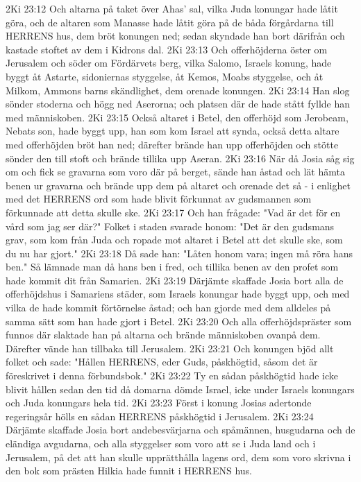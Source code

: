 2Ki 23:12  Och altarna på taket över Ahas' sal, vilka Juda konungar hade låtit göra, och de altaren som Manasse hade låtit göra på de båda förgårdarna till HERRENS hus, dem bröt konungen ned; sedan skyndade han bort därifrån och kastade stoftet av dem i Kidrons dal.
2Ki 23:13  Och offerhöjderna öster om Jerusalem och söder om Fördärvets berg, vilka Salomo, Israels konung, hade byggt åt Astarte, sidoniernas styggelse, åt Kemos, Moabs styggelse, och åt Milkom, Ammons barns skändlighet, dem orenade konungen.
2Ki 23:14  Han slog sönder stoderna och högg ned Aserorna; och platsen där de hade stått fyllde han med människoben.
2Ki 23:15  Också altaret i Betel, den offerhöjd som Jerobeam, Nebats son, hade byggt upp, han som kom Israel att synda, också detta altare med offerhöjden bröt han ned; därefter brände han upp offerhöjden och stötte sönder den till stoft och brände tillika upp Aseran.
2Ki 23:16  När då Josia såg sig om och fick se gravarna som voro där på berget, sände han åstad och lät hämta benen ur gravarna och brände upp dem på altaret och orenade det så - i enlighet med det HERRENS ord som hade blivit förkunnat av gudsmannen som förkunnade att detta skulle ske.
2Ki 23:17  Och han frågade: "Vad är det för en vård som jag ser där?" Folket i staden svarade honom: "Det är den gudsmans grav, som kom från Juda och ropade mot altaret i Betel att det skulle ske, som du nu har gjort."
2Ki 23:18  Då sade han: "Låten honom vara; ingen må röra hans ben." Så lämnade man då hans ben i fred, och tillika benen av den profet som hade kommit dit från Samarien.
2Ki 23:19  Därjämte skaffade Josia bort alla de offerhöjdshus i Samariens städer, som Israels konungar hade byggt upp, och med vilka de hade kommit förtörnelse åstad; och han gjorde med dem alldeles på samma sätt som han hade gjort i Betel.
2Ki 23:20  Och alla offerhöjdspräster som funnos där slaktade han på altarna och brände människoben ovanpå dem. Därefter vände han tillbaka till Jerusalem.
2Ki 23:21  Och konungen bjöd allt folket och sade: "Hållen HERRENS, eder Guds, påskhögtid, såsom det är föreskrivet i denna förbundsbok."
2Ki 23:22  Ty en sådan påskhögtid hade icke blivit hållen sedan den tid då domarna dömde Israel, icke under Israels konungars och Juda konungars hela tid.
2Ki 23:23  Först i konung Josias adertonde regeringsår hölls en sådan HERRENS påskhögtid i Jerusalem.
2Ki 23:24  Därjämte skaffade Josia bort andebesvärjarna och spåmännen, husgudarna och de eländiga avgudarna, och alla styggelser som voro att se i Juda land och i Jerusalem, på det att han skulle upprätthålla lagens ord, dem som voro skrivna i den bok som prästen Hilkia hade funnit i HERRENS hus.

